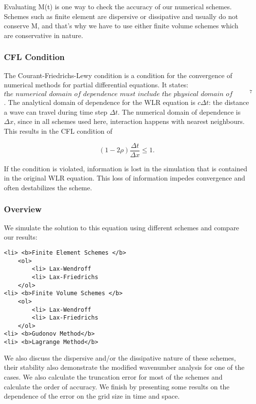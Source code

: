 \documentclass[11pt]{article}
\begin{document}
Evaluating M(t) is one way to check the accuracy of our numerical
schemes. Schemes such as finite element are dispersive or dissipative
and usually do not conserve M, and that's why we have to use either
finite volume schemes which are conservative in nature.

\subsubsection{CFL Condition}\label{cfl-condition}

The Courant-Friedrichs-Lewy condition is a condition for the convergence
of numerical methods for partial differential equations. It states:
\(\textit{the numerical domain of dependence must include the physical domain of dependence}^7\).
The analytical domain of dependence for the WLR equation is
\(c\Delta t\): the distance a wave can travel during time step
\(\Delta t\). The numerical domain of dependence is \(\Delta x\), since
in all schemes used here, interaction happens with nearest neighbours.
This results in the CFL condition of

\begin{equation}
    (1-2\rho) \frac{\Delta t}{\Delta x} \leq 1.
\end{equation}

If the condition is violated, information is lost in the simulation that
is contained in the original WLR equation. This loss of information
impedes convergence and often destabilizes the scheme.

\subsubsection{Overview}\label{overview}

We simulate the solution to this equation using different schemes and
compare our results:

\begin{verbatim}
<li> <b>Finite Element Schemes </b>
    <ol>
        <li> Lax-Wendroff
        <li> Lax-Friedrichs
    </ol>
<li> <b>Finite Volume Schemes </b>
    <ol>
        <li> Lax-Wendroff
        <li> Lax-Friedrichs
    </ol>
<li> <b>Gudonov Method</b>
<li> <b>Lagrange Method</b>
\end{verbatim}

We also discuss the dispersive and/or the dissipative nature of these
schemes, their stability also demonstrate the modified wavenumber
analysis for one of the cases. We also calculate the truncation error
for most of the schemes and calculate the order of accuracy. We finish
by presenting some results on the dependence of the error on the grid
size in time and space.
\end{document}
